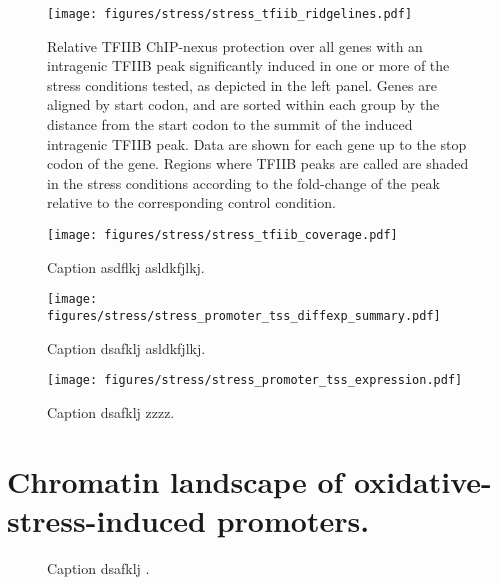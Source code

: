 \begin{sidewaysfigure}
    \texttt{[image: figures/stress/stress\_tfiib\_ridgelines.pdf]}
    \caption[TFIIB ChIP-nexus protection over all genes with stress-induced intragenic TFIIB peaks.]{Relative TFIIB ChIP-nexus protection over all genes with an intragenic TFIIB peak significantly induced in one or more of the stress conditions tested, as depicted in the left panel. Genes are aligned by start codon, and are sorted within each group by the distance from the start codon to the summit of the induced intragenic TFIIB peak. Data are shown for each gene up to the stop codon of the gene. Regions where TFIIB peaks are called are shaded in the stress conditions according to the fold-change of the peak relative to the corresponding control condition.}
    \label{fig:stress_tfiib_ridgelines}
\end{sidewaysfigure}

\begin{figure}
\texttt{[image: figures/stress/stress\_tfiib\_coverage.pdf]}
\label{fig:stress_tfiib_coverage}
\caption[TFIIB ChIP-nexus protection over four genes with stress-induced intragenic TFIIB peaks.]{Caption asdflkj asldkfjlkj.}
\end{figure}

\begin{figure}
\texttt{[image: figures/stress/stress\_promoter\_tss\_diffexp\_summary.pdf]}
\caption[Bar plot of the number of promoters from various genomic classes differentially expressed in oxidative stress.]{Caption dsafklj asldkfjlkj.}
\label{fig:stress_promoter_tss_diffexp_summary}
\end{figure}

\begin{figure}
\texttt{[image: figures/stress/stress\_promoter\_tss\_expression.pdf]}
\caption[TSS-seq expression levels in oxidative stress of oxidative-stress-induced genic and intragenic promoters.]{Caption dsafklj zzzz.}
\label{fig:stress_promoter_tss_diffexp_summary}
\end{figure}

\section{Chromatin landscape of oxidative-stress-induced promoters.}

\lipsum[1]

\begin{figure}
\caption[A figure showing TSS-seq, TFIIB ChIP-nexus, and MNase-ChIP-seq for the oxidative-stress-induced promoters.]{Caption dsafklj .}
\end{figure}

